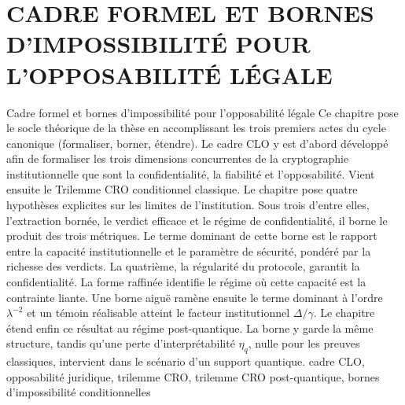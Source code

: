 \documentclass[a4paper,11pt,reqno,oneside]{memoir}
\begin{document}
\chapter[CADRE FORMEL ET BORNES D'IMPOSSIBILIT\'E POUR L'OPPOSABILIT\'E L\'EGALE]%
        {CADRE FORMEL ET BORNES D'IMPOSSIBILIT\'E POUR L'OPPOSABILIT\'E L\'EGALE}
\label{chap:cadre_formel}
\debutChapitre%
  {Cadre formel et bornes d'impossibilit\'e pour l'opposabilit\'e l\'egale}%
  {%
    Ce chapitre pose le socle th\'eorique de la th\`ese en accomplissant les
    trois premiers actes du cycle canonique (formaliser, borner, \'etendre).
    Le cadre CLO y est d'abord d\'evelopp\'e afin de formaliser les trois
    dimensions concurrentes de la cryptographie institutionnelle que sont la
    confidentialit\'e, la fiabilit\'e et l'opposabilit\'e. Vient ensuite le
    Trilemme CRO conditionnel classique. Le chapitre pose quatre hypoth\`eses explicites
    sur les limites de l'institution. Sous trois d'entre elles, l'extraction born\'ee, le
    verdict efficace et le r\'egime de confidentialit\'e, il borne le produit des trois
    m\'etriques. Le terme dominant de cette borne est le rapport entre la capacit\'e
    institutionnelle et le param\`etre de s\'ecurit\'e, pond\'er\'e par la richesse des
    verdicts. La quatri\`eme, la r\'egularit\'e du protocole, garantit la confidentialit\'e.
    La forme raffin\'ee identifie le r\'egime o\`u cette capacit\'e est la contrainte liante.
    Une borne aigu\"e ram\`ene ensuite le terme dominant \`a l'ordre $\lambda^{-2}$ et un
    t\'emoin r\'ealisable atteint le facteur institutionnel $\Delta/\gamma$. Le chapitre \'etend enfin ce
    r\'esultat au r\'egime post-quantique. La borne y garde la m\^eme structure,
    tandis qu'une perte d'interpr\'etabilit\'e $\eta_q$, nulle pour les preuves
    classiques, intervient dans le sc\'enario d'un support quantique.%
  }%
  {%
    cadre CLO, opposabilit\'e juridique, trilemme CRO, trilemme CRO
    post-quantique, bornes d'impossibilit\'e conditionnelles%
  }%







\end{document}
